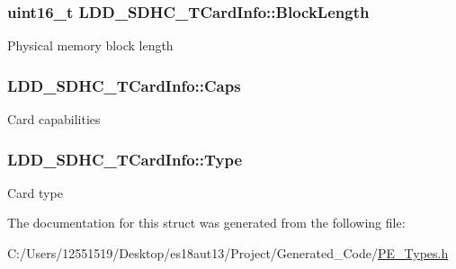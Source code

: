 \subsubsection[{Block\+Length}]{\setlength{\rightskip}{0pt plus 5cm}uint16\+\_\+t L\+D\+D\+\_\+\+S\+D\+H\+C\+\_\+\+T\+Card\+Info\+::\+Block\+Length}\label{struct_l_d_d___s_d_h_c___t_card_info_a46cbdea4ece83eeaa17410e9763cc3a9}
Physical memory block length \hypertarget{struct_l_d_d___s_d_h_c___t_card_info_a591c22d1aa49944325b35c63d2bf8199}{}
\subsubsection[{Caps}]{ L\+D\+D\+\_\+\+S\+D\+H\+C\+\_\+\+T\+Card\+Info\+::\+Caps}\label{struct_l_d_d___s_d_h_c___t_card_info_a591c22d1aa49944325b35c63d2bf8199}
Card capabilities \hypertarget{struct_l_d_d___s_d_h_c___t_card_info_ab2b86f6fe821778459edd351d08eb4bd}{}
\subsubsection[{Type}]{ L\+D\+D\+\_\+\+S\+D\+H\+C\+\_\+\+T\+Card\+Info\+::\+Type}\label{struct_l_d_d___s_d_h_c___t_card_info_ab2b86f6fe821778459edd351d08eb4bd}
Card type 

The documentation for this struct was generated from the following file\+:\begin{DoxyCompactItemize}
\item 
C\+:/\+Users/12551519/\+Desktop/es18aut13/\+Project/\+Generated\+\_\+\+Code/\hyperlink{_p_e___types_8h}{P\+E\+\_\+\+Types.\+h}\end{DoxyCompactItemize}
